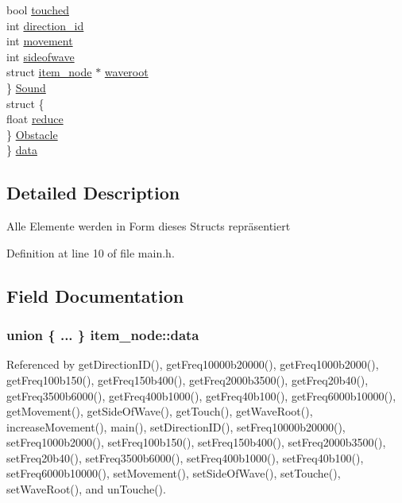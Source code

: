 \begin{DoxyCompactItemize}
\begin{tabbing}
\>\>bool \hyperlink{structitem__node_afbb25b821a00049b840588c90e0fe61f}{touched}\\
\>\>int \hyperlink{structitem__node_a1dedd9aeed9baab9f41d4dbb58554334}{direction\_id}\\
\>\>int \hyperlink{structitem__node_ad21d3205184a0bb91a381471d83c1f09}{movement}\\
\>\>int \hyperlink{structitem__node_a77861ad11dd6c8a8f917ced69e388e8e}{sideofwave}\\
\>\>struct \hyperlink{structitem__node}{item\_node} $\ast$ \hyperlink{structitem__node_a42ec4577ca5274298633cd22b51568cc}{waveroot}\\
\>\} \hyperlink{structitem__node_ae6671661190e93efee5a39ecfade977b}{Sound}\\
\>struct \{\\
\>\>float \hyperlink{structitem__node_a646507ee88a47e76648e7270b051ea2b}{reduce}\\
\>\} \hyperlink{structitem__node_a10c54e03efef949ca5c2c13dc953a11f}{Obstacle}\\
\} \hyperlink{structitem__node_a8ce92c776dadf819b1bdc964dbd7517c}{data}\\

\end{tabbing}\end{DoxyCompactItemize}


\subsection{Detailed Description}
Alle Elemente werden in Form dieses Structs repräsentiert 

Definition at line 10 of file main.\+h.



\subsection{Field Documentation}
\subsubsection[{data}]{\setlength{\rightskip}{0pt plus 5cm}union \{ ... \}   item\+\_\+node\+::data}\hypertarget{structitem__node_a8ce92c776dadf819b1bdc964dbd7517c}{}\label{structitem__node_a8ce92c776dadf819b1bdc964dbd7517c}


Referenced by get\+Direction\+I\+D(), get\+Freq10000b20000(), get\+Freq1000b2000(), get\+Freq100b150(), get\+Freq150b400(), get\+Freq2000b3500(), get\+Freq20b40(), get\+Freq3500b6000(), get\+Freq400b1000(), get\+Freq40b100(), get\+Freq6000b10000(), get\+Movement(), get\+Side\+Of\+Wave(), get\+Touch(), get\+Wave\+Root(), increase\+Movement(), main(), set\+Direction\+I\+D(), set\+Freq10000b20000(), set\+Freq1000b2000(), set\+Freq100b150(), set\+Freq150b400(), set\+Freq2000b3500(), set\+Freq20b40(), set\+Freq3500b6000(), set\+Freq400b1000(), set\+Freq40b100(), set\+Freq6000b10000(), set\+Movement(), set\+Side\+Of\+Wave(), set\+Touche(), set\+Wave\+Root(), and un\+Touche().

